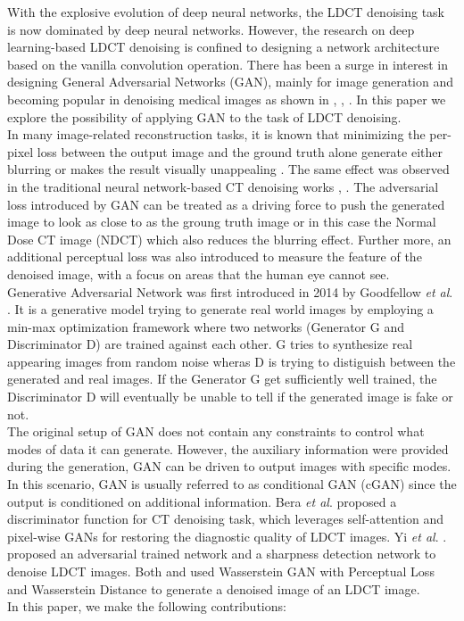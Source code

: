 \documentclass[journal]{IEEEtran}
\begin{document}
With the explosive evolution of deep neural networks, the LDCT denoising task is now dominated by deep neural networks.  However, the research on deep learning-based LDCT denoising is confined to designing a network architecture based on the vanilla convolution operation.  There has been a surge in interest in designing General Adversarial Networks (GAN), mainly for image generation and becoming popular in denoising medical images as shown in \cite{8340157}, \cite{9474492}, \cite{yin2021unpaired}.  In this paper we explore the possibility of applying GAN to the task of LDCT denoising.\\
	In many image-related reconstruction tasks, it is known that minimizing the per-pixel loss between the output image and the ground truth alone generate either blurring or makes the result visually unappealing \cite{huang2017beyond}.  The same effect was observed in the traditional neural network-based CT denoising works \cite{chen2017low}, \cite{chen2017low2}.  The adversarial loss introduced by GAN can be treated as a driving force to push the generated image to look as close to as the groung truth image or in this case the Normal Dose CT image (NDCT) which also reduces the blurring effect. Further more, an additional perceptual loss was also introduced to measure the feature of the denoised image, with a focus on areas that the human eye cannot see. \\
Generative Adversarial Network was first introduced in 2014 by Goodfellow \emph{et al}. \cite{goodfellow2014generative}.  It is a generative model trying to generate real world images by employing a min-max optimization framework where two networks (Generator G and Discriminator D) are trained against each other.  G tries to synthesize real appearing images from random noise wheras D is trying to distiguish between the generated and real images.  If the Generator G get sufficiently well trained, the Discriminator D will eventually be unable to tell if the generated image is fake or not.\\
	The original setup of GAN does not contain any constraints to control what modes of data it can generate.  However, the auxiliary information were provided during the generation, GAN can be driven to output images with specific modes.  In this scenario, GAN is usually referred to as conditional GAN (cGAN) since the output is conditioned on additional information.  Bera \emph{et al}. \cite{9474492} proposed a discriminator function for CT denoising task, which leverages self-attention and pixel-wise GANs for restoring the diagnostic quality of LDCT images.  Yi \emph{et al}. \cite{yi2018sharpness}. proposed an adversarial trained network and a sharpness detection network to denoise LDCT images. Both \cite{8340157} and \cite{yin2021unpaired} used Wasserstein GAN with Perceptual Loss and Wasserstein Distance to generate a denoised image of an LDCT image. \\
	In this paper, we make the following contributions:
	
\end{document}
